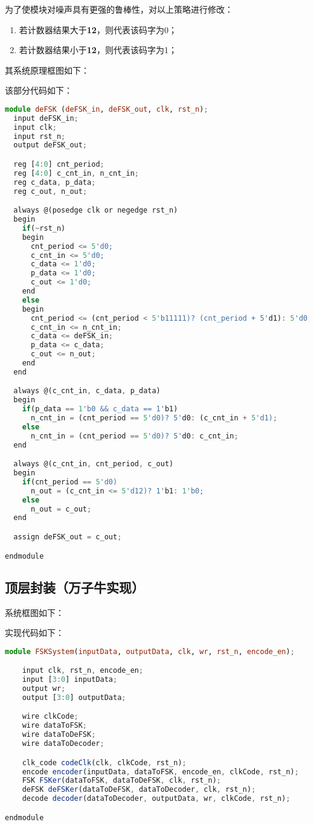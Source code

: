 \documentclass{progartcn}
\begin{document}
为了使模块对噪声具有更强的鲁棒性，对以上策略进行修改：
\begin{enumerate}
  \item 若计数器结果大于\textbf{12}，则代表该码字为0；
  \item 若计数器结果小于\textbf{12}，则代表该码字为1；
\end{enumerate}

其系统原理框图如下：


该部分代码如下：

\begin{lstlisting}[language=TypeScript,caption={deFSK.v}]
module deFSK (deFSK_in, deFSK_out, clk, rst_n);
  input deFSK_in;
  input clk;
  input rst_n;
  output deFSK_out;

  reg [4:0] cnt_period;
  reg [4:0] c_cnt_in, n_cnt_in;
  reg c_data, p_data;
  reg c_out, n_out;

  always @(posedge clk or negedge rst_n)
  begin
    if(~rst_n)
    begin
      cnt_period <= 5'd0;
      c_cnt_in <= 5'd0;
      c_data <= 1'd0;
      p_data <= 1'd0;
      c_out <= 1'd0;
    end
    else
    begin
      cnt_period <= (cnt_period < 5'b11111)? (cnt_period + 5'd1): 5'd0;
      c_cnt_in <= n_cnt_in;
      c_data <= deFSK_in;
      p_data <= c_data;
      c_out <= n_out;
    end
  end

  always @(c_cnt_in, c_data, p_data)
  begin
    if(p_data == 1'b0 && c_data == 1'b1)
      n_cnt_in = (cnt_period == 5'd0)? 5'd0: (c_cnt_in + 5'd1);
    else
      n_cnt_in = (cnt_period == 5'd0)? 5'd0: c_cnt_in;
  end

  always @(c_cnt_in, cnt_period, c_out)
  begin
    if(cnt_period == 5'd0)
      n_out = (c_cnt_in <= 5'd12)? 1'b1: 1'b0;
    else
      n_out = c_out;
  end

  assign deFSK_out = c_out;

endmodule
\end{lstlisting}

\subsection{顶层封装（万子牛实现）}

系统框图如下：

实现代码如下：

\begin{lstlisting}[language=TypeScript,caption={FSKSystem.v}]
module FSKSystem(inputData, outputData, clk, wr, rst_n, encode_en);

    input clk, rst_n, encode_en;
    input [3:0] inputData;
    output wr;
    output [3:0] outputData;

    wire clkCode;
    wire dataToFSK;
    wire dataToDeFSK;
    wire dataToDecoder;

    clk_code codeClk(clk, clkCode, rst_n);
    encode encoder(inputData, dataToFSK, encode_en, clkCode, rst_n);
    FSK FSKer(dataToFSK, dataToDeFSK, clk, rst_n);
    deFSK deFSKer(dataToDeFSK, dataToDecoder, clk, rst_n);
    decode decoder(dataToDecoder, outputData, wr, clkCode, rst_n);

endmodule
\end{lstlisting}
\end{document}
